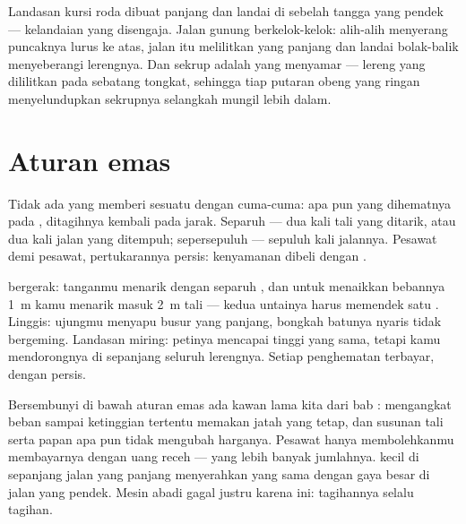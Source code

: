 \begin{example}\label{ex:g5:simple-machines:ramps}
Landasan kursi roda dibuat panjang dan landai di sebelah tangga yang
pendek --- kelandaian yang disengaja. Jalan gunung berkelok-kelok:
alih-alih menyerang puncaknya lurus ke atas, jalan itu melilitkan
 yang panjang dan landai bolak-balik menyeberangi
lerengnya. Dan sekrup adalah  yang menyamar --- lereng
yang dililitkan pada sebatang tongkat, sehingga tiap putaran obeng
yang ringan menyelundupkan sekrupnya selangkah mungil lebih dalam.
\end{example}

\section{Aturan emas}

\begin{proposition}\label{prop:g5:simple-machines:golden}
Tidak ada  yang memberi sesuatu dengan cuma-cuma: apa
pun yang dihematnya pada , ditagihnya kembali pada jarak. Separuh
 --- dua kali tali yang ditarik, atau dua kali jalan yang
ditempuh; sepersepuluh  --- sepuluh kali jalannya. Pesawat demi
pesawat, pertukarannya persis: kenyamanan dibeli dengan .
\end{proposition}

\begin{example}\label{ex:g5:simple-machines:check}
 bergerak: tanganmu menarik dengan separuh , dan untuk
menaikkan bebannya \qty{1}{m} kamu menarik masuk \qty{2}{m} tali ---
kedua untainya harus memendek satu . Linggis: ujungmu menyapu
busur yang panjang, bongkah batunya nyaris tidak bergeming. Landasan
miring: petinya mencapai tinggi yang sama, tetapi kamu mendorongnya di
sepanjang seluruh lerengnya. Setiap penghematan terbayar, dengan
persis.
\end{example}

\begin{remark}\label{rem:g5:simple-machines:whygolden}
Bersembunyi di bawah aturan emas ada kawan lama kita dari bab :
mengangkat beban sampai ketinggian tertentu memakan jatah  yang
tetap, dan susunan tali serta papan apa pun tidak mengubah harganya.
Pesawat hanya membolehkanmu membayarnya dengan uang receh --- yang
lebih banyak jumlahnya.  kecil di sepanjang jalan yang panjang
menyerahkan  yang sama dengan gaya besar di jalan yang pendek.
Mesin abadi gagal justru karena ini: tagihannya selalu tagihan.
\end{remark}

